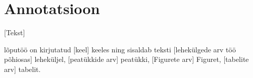 \section*{\centering Annotatsioon}

[Tekst]

lõputöö on kirjutatud [keel] keeles ning sisaldab teksti [lehekülgede arv töö põhiosas] leheküljel, 
[peatükkide arv] peatükki,  [Figurete arv] Figuret,  [tabelite arv] tabelit.



\pagebreak